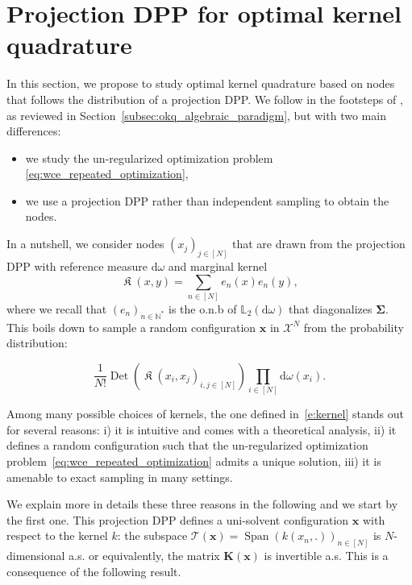 \documentclass[twoside,11pt]{book}
\numberwithin{theorem}{chapter}
\numberwithin{definition}{chapter}
\numberwithin{proposition}{chapter}
\numberwithin{corollary}{chapter}
\numberwithin{example}{chapter}
\numberwithin{lemma}{chapter}
\DeclareMathOperator{\Det}{Det}
\DeclareMathOperator{\Span}{\mathrm{Span}}
\DeclareMathOperator*{\KDPP}{\mathfrak{K}}
\begin{document}
\section{Projection DPP for optimal kernel quadrature}\label{sec:pDPP_OKQ}
In this section, we propose to study optimal kernel quadrature based on nodes that follows the distribution of a projection DPP. We follow in the footsteps of \cite{Bac17}, as reviewed in Section~\ref{subsec:okq_algebraic_paradigm}, but with two main differences:
\begin{itemize}
\item we study the un-regularized optimization problem \eqref{eq:wce_repeated_optimization},
\item we use a projection DPP rather than independent sampling to obtain the nodes.
\end{itemize}

In a nutshell, we consider nodes $(x_{j})_{j \in [N]}$ that are drawn from the projection DPP with reference measure $\mathrm{d}\omega$ and marginal kernel
\begin{equation}
  \KDPP(x,y) = \sum\limits_{n \in [N]} e_{n}(x)e_{n}(y),
  \label{e:kernel}
\end{equation}
where we recall that $(e_{n})_{n \in \mathbb{N}^{*}}$ is the o.n.b of $\mathbb{L}_{2}(\mathrm{d}\omega)$ that diagonalizes $\bm{\Sigma}$. This boils down to sample a random configuration $\bm{x}$ in $\mathcal{X}^{N}$ from the probability distribution:

\begin{equation}\label{eq:pdpp_definition}
\frac{1}{N!} \Det(\KDPP(x_{i},x_{j})_{i,j \in [N]}) \prod_{i \in [N]} \mathrm{d}\omega(x_{i}).
\end{equation}



Among many possible choices of kernels, the one defined in~\eqref{e:kernel} stands out for several reasons: i) it is intuitive and comes with a theoretical analysis, ii)
it defines a random configuration such that the un-regularized optimization problem~\eqref{eq:wce_repeated_optimization} admits a unique solution, iii) it is amenable to exact sampling in many settings.

We explain more in details these three reasons in the following and we start by the first one. This projection DPP defines a uni-solvent configuration $\bm{x}$ with respect to the kernel $k$: the subspace $\mathcal{T}(\bm{x}) = \Span (k(x_{n},.))_{n \in [N]}$ is $N$-dimensional a.s. or equivalently, the matrix $\bm{K}(\bm{x})$ is invertible a.s. This is a consequence of the following result.
\end{document}
